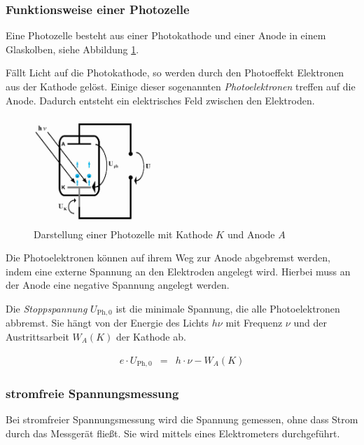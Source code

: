 \documentclass[12pt,a4paper]{scrartcl}
\numberwithin{equation}{section} %
\begin{document}
\subsubsection{Funktionsweise einer Photozelle}
Eine Photozelle besteht aus einer Photokathode und einer Anode in einem Glaskolben, siehe Abbildung \ref{fig:photozelle}.

Fällt Licht auf die Photokathode, so werden durch den Photoeffekt Elektronen aus der Kathode gelöst. Einige dieser sogenannten \textit{Photoelektronen} treffen auf die Anode. Dadurch entsteht ein elektrisches Feld zwischen den Elektroden.

\begin{figure}[h]
	\centering
	\includegraphics[width=0.4\textwidth]{../media/B1.4/Photozelle.jpg}
	\caption{Darstellung einer Photozelle mit Kathode $K$ und Anode $A$ \cite{uni}}
	\label{fig:photozelle}
\end{figure}

Die Photoelektronen können auf ihrem Weg zur Anode abgebremst werden, indem eine externe Spannung an den Elektroden angelegt wird. Hierbei muss an der Anode eine negative Spannung angelegt werden.

Die \textit{Stoppspannung} $U_{\mathrm{Ph}, 0}$ ist die minimale Spannung, die alle Photoelektronen abbremst. Sie hängt von der Energie des Lichts $h\nu$ mit Frequenz $\nu$ und der Austrittsarbeit $W_A(K)$ der Kathode ab. \cite{Gerthsen}

\begin{eqnarray}
	e \cdot U_{\mathrm{Ph}, 0} &=& h \cdot \nu - W_A (K)
\end{eqnarray}

\subsubsection{stromfreie Spannungsmessung}
Bei stromfreier Spannungsmessung wird die Spannung gemessen, ohne dass Strom durch das Messgerät fließt. Sie wird mittels eines Elektrometers durchgeführt.
\end{document}
